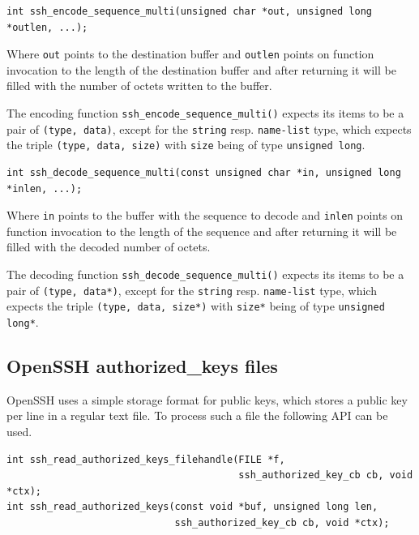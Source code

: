 \documentclass[synpaper]{book}
\begin{document}
\begin{verbatim}
int ssh_encode_sequence_multi(unsigned char *out, unsigned long *outlen, ...);
\end{verbatim}

Where \texttt{out} points to the destination buffer and  \texttt{outlen} points
on function invocation to the length of the destination buffer
and after returning it will be filled with the number of octets written to the buffer.

The encoding function \texttt{ssh\_encode\_sequence\_multi()} expects its items to be a pair of \texttt{(type, data)},
except for the \texttt{string} resp. \texttt{name-list} type, which expects the triple \texttt{(type, data, size)}
with \texttt{size} being of type \texttt{unsigned long}.


\begin{verbatim}
int ssh_decode_sequence_multi(const unsigned char *in, unsigned long *inlen, ...);
\end{verbatim}

Where \texttt{in} points to the buffer with the sequence to decode and \texttt{inlen} points
on function invocation to the length of the sequence
and after returning it will be filled with the decoded number of octets.

The decoding function \texttt{ssh\_decode\_sequence\_multi()} expects its items to be a pair of \texttt{(type, data*)},
except for the \texttt{string} resp. \texttt{name-list} type, which expects the triple \texttt{(type, data, size*)}
with \texttt{size*} being of type \texttt{unsigned long*}.



\subsection{OpenSSH authorized\_keys files}

OpenSSH uses a simple storage format for public keys, which stores a public key per line in a regular text file.
To process such a file the following API can be used.

\begin{verbatim}
int ssh_read_authorized_keys_filehandle(FILE *f,
                                        ssh_authorized_key_cb cb, void *ctx);
int ssh_read_authorized_keys(const void *buf, unsigned long len,
                             ssh_authorized_key_cb cb, void *ctx);
\end{verbatim}
\end{document}
